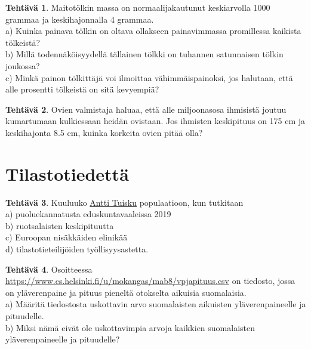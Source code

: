 \documentclass[12pt,leqno,a4paper,oneside]{amsart}
\theoremstyle{definition}
\newtheorem{exercise}{Tehtävä}
\theoremstyle{remark}
\numberwithin{equation}{section}
\begin{document}
\begin{exercise}
  Maitotölkin massa on normaalijakautunut keskiarvolla 1000 grammaa ja keskihajonnalla 4 grammaa.\\
  a) Kuinka painava tölkin on oltava ollakseen painavimmassa promillessa kaikista tölkeistä?\\
  b) Millä todennäköisyydellä tällainen tölkki on tuhannen satunnaisen tölkin joukossa?\\
  c) Minkä painon tölkittäjä voi ilmoittaa vähimmäispainoksi, jos halutaan, että alle prosentti tölkeistä on sitä kevyempiä?
\end{exercise}

\begin{exercise}
  Ovien valmistaja haluaa, että alle miljoonasosa ihmisistä joutuu kumartumaan kulkiessaan heidän ovistaan. Jos ihmisten keskipituus on
  175 cm ja keskihajonta 8.5 cm, kuinka korkeita ovien pitää olla?
\end{exercise}


\section{Tilastotiedettä}




\begin{exercise}
 Kuuluuko \href{https://fi.wikipedia.org/wiki/Antti_Tuisku}{Antti Tuisku} populaatioon, kun tutkitaan\\
 a) puoluekannatusta eduskuntavaaleissa 2019\\
 b) ruotsalaisten keskipituutta\\
 c) Euroopan nisäkkäiden elinikää\\
 d) tilastotieteilijöiden työllisyysastetta.
\end{exercise}



\begin{exercise}
 Osoitteessa \url{https://www.cs.helsinki.fi/u/mokangas/mab8/vpjapituus.csv} on tiedosto, jossa on yläverenpaine ja pituus pieneltä otokselta
 aikuisia suomalaisia. \\
 a) Määritä tiedostosta uskottavin arvo suomalaisten aikuisten yläveren\-paineelle ja pituudelle.\\
 b) Miksi nämä eivät ole uskottavimpia arvoja kaikkien suomalaisten yläverenpaineelle ja pituudelle?
\end{exercise}
\end{document}

